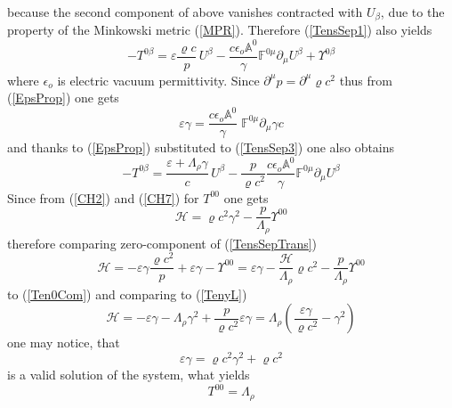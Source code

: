 \documentclass[aps,prx,preprint,groupedaddress,showkeys]{revtex4-2}
\begin{document}
because the second component of above vanishes contracted with $U_{\beta}$, due to the property of the Minkowski metric (\ref{MPR}). Therefore (\ref{TensSep1}) also yields
\begin{equation} \label{TensSepTrans}
- T^{0 \beta} =  \varepsilon \frac{\varrho c}{p} \, U^{\beta} - \frac{c \epsilon_o \mathbb{A}^0}{\gamma} \mathbb{F}^{0 \mu} \partial_{\mu} U^{\beta} + \Upsilon^{0 \beta}
\end{equation}
where $\epsilon_o$ is electric vacuum permittivity. Since $\partial^{\mu} p = \partial^{\mu} \varrho c^2$ thus from (\ref{EpsProp}) one gets
\begin{equation} \label{Epsilon}
\varepsilon \gamma = \frac{ c \epsilon_o \mathbb{A}^0}{\gamma} \; \mathbb{F}^{0 \mu} \partial_{\mu} \gamma c 
\end{equation}
and thanks to (\ref{EpsProp}) substituted to (\ref{TensSep3}) one also obtains
\begin{equation} \label{TenyL}
- T^{0 \beta} =  \frac{\varepsilon + \Lambda_{\rho} \gamma}{c} \, U^{\beta} - \frac{p}{\varrho c^2} \frac{c \epsilon_o \mathbb{A}^0}{\gamma } \mathbb{F}^{0 \mu} \partial_{\mu} U^{\beta} 
\end{equation}
Since from (\ref{CH2}) and (\ref{CH7}) for $T^{0 0}$ one gets
\begin{equation} \label{Ten0Com}
\mathcal{H} = \varrho c^2 \gamma^2 - \frac{p}{\Lambda_{\rho}}  \Upsilon^{0 0}
\end{equation}
therefore comparing zero-component of (\ref{TensSepTrans}) 
\begin{equation} \label{0Component1}
\mathcal{H} = - \varepsilon \gamma \frac{\varrho c^2}{p} + \varepsilon \gamma - \Upsilon^{0 0} = \varepsilon \gamma - \frac{\mathcal{H}}{\Lambda_{\rho}} \varrho c^2 - \frac{p}{\Lambda_{\rho}}  \Upsilon^{0 0}
\end{equation}
to (\ref{Ten0Com}) and comparing to (\ref{TenyL}) 
\begin{equation} \label{0Component2}
\mathcal{H} = - \varepsilon \gamma - \Lambda_{\rho} \gamma^2 + \frac{p}{\varrho c^2} \varepsilon \gamma = \Lambda_{\rho} \left ( \frac{\varepsilon \gamma}{\varrho c^2} - \gamma^2  \right )
\end{equation}
one may notice, that
\begin{equation} \label{HQ4e}
\varepsilon \gamma = \varrho c^2 \gamma ^2 + \varrho c^2
\end{equation}
is a valid solution of the system, what yields
\begin{equation} \label{Hvalue}
T^{0 0} = \Lambda_{\rho}
\end{equation}
\end{document}
